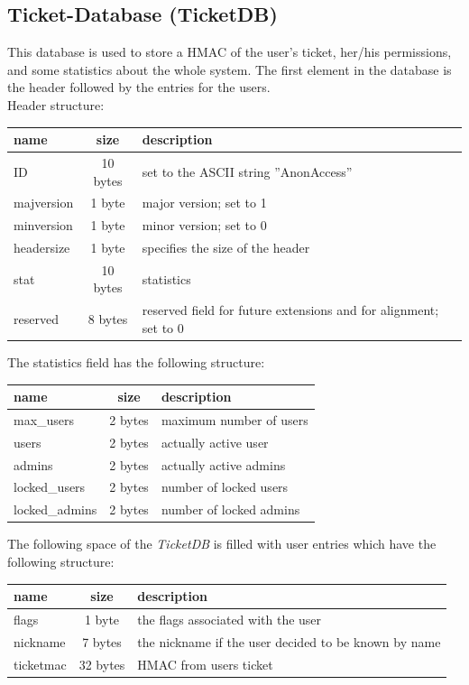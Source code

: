 
\subsection{Ticket-Database (TicketDB)}
This database is used to store a HMAC of the user's ticket, her/his permissions, and some statistics about the whole system.
The first element in the database is the header followed by the entries for the users.\\
Header structure:\\
\begin{tabular}{|l|c|p{8cm}|}\hline 
name & size & description \\ \hline
ID & 10 bytes & set to the ASCII string ''AnonAccess'' \\
majversion & 1 byte & major version; set to 1 \\
minversion & 1 byte & minor version; set to 0 \\
headersize & 1 byte & specifies the size of the header \\
stat & 10 bytes & statistics \\
reserved & 8 bytes & reserved field for future extensions and for alignment; set to 0 \\ \hline
\end{tabular} 

The statistics field has the following structure:\\
\begin{tabular}{|l|c|l|} \hline
name & size & description \\ \hline 
max\_users     & 2 bytes & maximum number of users \\
users          & 2 bytes & actually active user \\
admins         & 2 bytes & actually active admins \\
locked\_users  & 2 bytes & number of locked users \\
locked\_admins & 2 bytes & number of locked admins \\ \hline
\end{tabular} 

The following space of the \textit{TicketDB} is filled with user entries which have the following structure:\\
\begin{tabular}{|l|c|l|} \hline
name & size & description \\ \hline 
flags      &  1 byte  & the flags associated with the user \\
nickname   &  7 bytes & the nickname if the user decided to be known by name \\
ticketmac  & 32 bytes & HMAC from users ticket \\ \hline
\end{tabular} 

